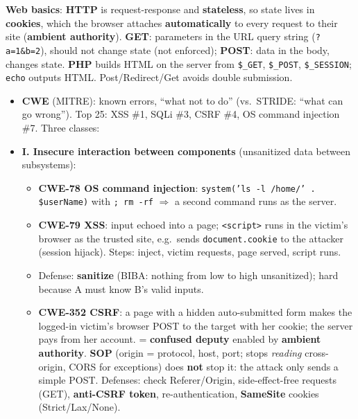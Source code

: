 \begin{recapbox}[title={Exam-ready recap --- Lecture 9: Adversarial thinking II}]
\textbf{Web basics}: \textbf{HTTP} is request-response and \textbf{stateless}, so state lives in
\textbf{cookies}, which the browser attaches \textbf{automatically} to every request to their site
(\textbf{ambient authority}). \textbf{GET}: parameters in the URL query string (\texttt{?a=1\&b=2}),
should not change state (not enforced); \textbf{POST}: data in the body, changes state. \textbf{PHP}
builds HTML on the server from \texttt{\$\_GET}, \texttt{\$\_POST}, \texttt{\$\_SESSION};
\texttt{echo} outputs HTML. Post/Redirect/Get avoids double submission.
\begin{itemize}
  \item \textbf{CWE} (MITRE): known errors, ``what not to do'' (vs.\ STRIDE: ``what can go
        wrong''). Top 25: XSS \#1, SQLi \#3, CSRF \#4, OS command injection \#7. Three classes:
  \item \textbf{I. Insecure interaction between components} (unsanitized data between subsystems):
        \begin{itemize}
          \item \textbf{CWE-78 OS command injection}: \texttt{system('ls -l /home/' .
                \$userName)} with \texttt{; rm -rf} $\Rightarrow$ a second command runs as the
                server.
          \item \textbf{CWE-79 XSS}: input echoed into a page; \texttt{<script>} runs in the
                victim's browser as the trusted site, e.g.\ sends \texttt{document.cookie} to the
                attacker (session hijack). Steps: inject, victim requests, page served, script runs.
          \item Defense: \textbf{sanitize} (BIBA: nothing from low to high unsanitized); hard
                because A must know B's valid inputs.
          \item \textbf{CWE-352 CSRF}: a page with a hidden auto-submitted form makes the logged-in
                victim's browser POST to the target with her cookie; the server pays from her
                account. = \textbf{confused deputy} enabled by \textbf{ambient authority}.
                \textbf{SOP} (origin = protocol, host, port; stops \emph{reading} cross-origin, CORS
                for exceptions) does \textbf{not} stop it: the attack only sends a simple POST.
                Defenses: check Referer/Origin, side-effect-free requests (GET), \textbf{anti-CSRF
                token}, re-authentication, \textbf{SameSite} cookies (Strict/Lax/None).

\end{itemize}
\end{itemize}
\end{recapbox}
